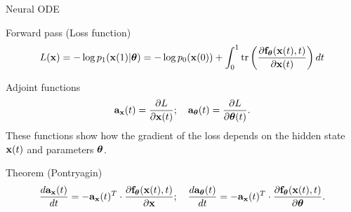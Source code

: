 \begin{frame}{Neural ODE}
	\begin{block}{Forward pass (Loss function)}
		\vspace{-0.3cm}
		\[
			L(\mathbf{x}) = - \log p_1(\mathbf{x}(1) | \boldsymbol{\theta}) = - \log p_0(\mathbf{x}(0)) + \int_{0}^{1} \text{tr} \left( \frac{\partial \mathbf{f}_{\boldsymbol{\theta}}(\mathbf{x}(t), t)}{\partial \mathbf{x}(t)} \right) dt
		\]
	\end{block}
	\vspace{-0.5cm}
	\begin{block}{Adjoint functions}
		\vspace{-0.3cm}
		\[
			\mathbf{a}_{\mathbf{x}}(t) = \frac{\partial L}{\partial \mathbf{x}(t)}; \quad \mathbf{a}_{\boldsymbol{\theta}}(t) = \frac{\partial L}{\partial \boldsymbol{\theta}(t)}.
		\]
		These functions show how the gradient of the loss depends on the hidden state~$\mathbf{x}(t)$ and parameters $\boldsymbol{\theta}$.
		\vspace{-0.3cm}
	\end{block}
	\begin{block}{Theorem (Pontryagin)}
		\vspace{-0.6cm}
		\[
		\frac{d \mathbf{a}_{\mathbf{x}}(t)}{dt} = - \mathbf{a}_{\mathbf{x}}(t)^T \cdot \frac{\partial \mathbf{f}_{\boldsymbol{\theta}}(\mathbf{x}(t), t)}{\partial \mathbf{x}}; \quad \frac{d \mathbf{a}_{\boldsymbol{\theta}}(t)}{dt} = - \mathbf{a}_{\mathbf{x}}(t)^T \cdot \frac{\partial \mathbf{f}_{\boldsymbol{\theta}}(\mathbf{x}(t),  t)}{\partial \boldsymbol{\theta}}.
		\]
		\vspace{-0.7cm}
	\end{block}
\end{frame}
